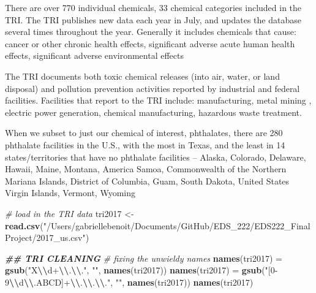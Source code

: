 \documentclass[
]{article}
\newenvironment{Shaded}{\begin{snugshade}}{\end{snugshade}}
\newcommand{\CommentTok}[1]{\textcolor[rgb]{0.56,0.35,0.01}{\textit{#1}}}
\newcommand{\DocumentationTok}[1]{\textcolor[rgb]{0.56,0.35,0.01}{\textbf{\textit{#1}}}}
\newcommand{\FunctionTok}[1]{\textcolor[rgb]{0.13,0.29,0.53}{\textbf{#1}}}
\newcommand{\NormalTok}[1]{#1}
\newcommand{\OtherTok}[1]{\textcolor[rgb]{0.56,0.35,0.01}{#1}}
\newcommand{\SpecialCharTok}[1]{\textcolor[rgb]{0.81,0.36,0.00}{\textbf{#1}}}
\newcommand{\StringTok}[1]{\textcolor[rgb]{0.31,0.60,0.02}{#1}}
\begin{document}
There are over 770 individual chemicals, 33 chemical categories included
in the TRI. The TRI publishes new data each year in July, and updates
the database several times throughout the year. Generally it includes
chemicals that cause: cancer or other chronic health effects,
significant adverse acute human health effects, significant adverse
environmental effects

The TRI documents both toxic chemical releases (into air, water, or land
disposal) and pollution prevention activities reported by industrial and
federal facilities. Facilities that report to the TRI include:
manufacturing, metal mining , electric power generation, chemical
manufacturing, hazardous waste treatment.

When we subset to just our chemical of interest, phthalates, there are
280 phthalate facilities in the U.S., with the most in Texas, and the
least in 14 states/territories that have no phthalate facilities --
Alaska, Colorado, Delaware, Hawaii, Maine, Montana, America Samoa,
Commonwealth of the Northern Mariana Islands, District of Columbia,
Guam, South Dakota, United States Virgin Islands, Vermont, Wyoming

\begin{Shaded}
\begin{Highlighting}[]
\CommentTok{\# load in the TRI data}
\NormalTok{tri2017 }\OtherTok{\textless{}{-}} \FunctionTok{read.csv}\NormalTok{(}\StringTok{"/Users/gabriellebenoit/Documents/GitHub/EDS\_222/EDS222\_FinalProject/2017\_us.csv"}\NormalTok{)}

\DocumentationTok{\#\# TRI CLEANING}
\CommentTok{\# fixing the unwieldy names}
\FunctionTok{names}\NormalTok{(tri2017) }\OtherTok{=} \FunctionTok{gsub}\NormalTok{(}\StringTok{"X}\SpecialCharTok{\textbackslash{}\textbackslash{}}\StringTok{d+}\SpecialCharTok{\textbackslash{}\textbackslash{}}\StringTok{.}\SpecialCharTok{\textbackslash{}\textbackslash{}}\StringTok{."}\NormalTok{, }\StringTok{""}\NormalTok{, }\FunctionTok{names}\NormalTok{(tri2017))}
\FunctionTok{names}\NormalTok{(tri2017) }\OtherTok{=} \FunctionTok{gsub}\NormalTok{(}\StringTok{"[0{-}9}\SpecialCharTok{\textbackslash{}\textbackslash{}}\StringTok{d}\SpecialCharTok{\textbackslash{}\textbackslash{}}\StringTok{.ABCD]+}\SpecialCharTok{\textbackslash{}\textbackslash{}}\StringTok{.}\SpecialCharTok{\textbackslash{}\textbackslash{}}\StringTok{.}\SpecialCharTok{\textbackslash{}\textbackslash{}}\StringTok{."}\NormalTok{, }\StringTok{""}\NormalTok{, }\FunctionTok{names}\NormalTok{(tri2017))}
\FunctionTok{names}\NormalTok{(tri2017)}
\end{Highlighting}
\end{Shaded}
\end{document}
